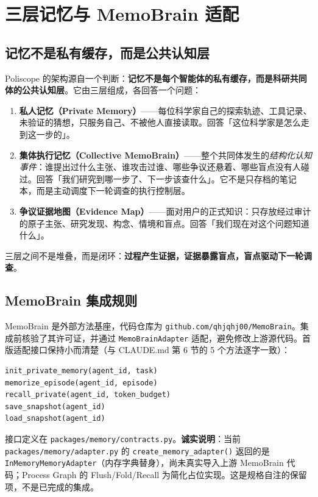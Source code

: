 \section{三层记忆与 MemoBrain 适配}

\subsection{记忆不是私有缓存，而是公共认知层}

Poliscope 的架构源自一个判断：\textbf{记忆不是每个智能体的私有缓存，而是科研共同体的公共认知层}。它由三层组成，各回答一个问题：

\begin{enumerate}
\item \textbf{私人记忆（Private Memory）}——每位科学家自己的探索轨迹、工具记录、未验证的猜想，只服务自己、不被他人直接读取。回答「这位科学家是怎么走到这一步的」。
\item \textbf{集体执行记忆（Collective MemoBrain）}——整个共同体发生的\emph{结构化认知事件}：谁提出过什么主张、谁攻击过谁、哪些争议还悬着、哪些盲点没有人碰过。回答「我们研究到哪一步了、下一步该查什么」。它不是只存档的笔记本，而是主动调度下一轮调查的执行控制层。
\item \textbf{争议证据地图（Evidence Map）}——面对用户的正式知识：只存放经过审计的原子主张、研究发现、构念、情境和盲点。回答「我们现在对这个问题知道什么」。
\end{enumerate}

三层之间不是堆叠，而是闭环：\textbf{过程产生证据，证据暴露盲点，盲点驱动下一轮调查}。

\subsection{MemoBrain 集成规则}

MemoBrain 是外部方法基座，代码仓库为 \texttt{github.com/qhjqhj00/MemoBrain}。集成前核验了其许可证，并通过 \texttt{MemoBrainAdapter} 适配，避免修改上游源代码。首版适配接口保持小而清楚（与 CLAUDE.md 第 6 节的 5 个方法逐字一致）：

\begin{lstlisting}[language=Python]
init_private_memory(agent_id, task)
memorize_episode(agent_id, episode)
recall_private(agent_id, token_budget)
save_snapshot(agent_id)
load_snapshot(agent_id)
\end{lstlisting}

接口定义在 \texttt{packages/memory/contracts.py}。\textbf{诚实说明}：当前 \texttt{packages/memory/adapter.py} 的 \texttt{create\_memory\_adapter()} 返回的是 \texttt{InMemoryMemoryAdapter}（内存字典替身），尚未真实导入上游 MemoBrain 代码；Process Graph 的 Flush/Fold/Recall 为简化占位实现。这是规格自注的保留项，不是已完成的集成。

